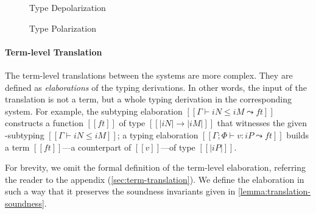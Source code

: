 \begin{figure}[ht]
  \begin{minipage}[t]{0.65\linewidth}
    \centering
      \begin{minipage}[t]{0.32\linewidth}
      \ottfundefnunpolP{}
      \end{minipage}
      \begin{minipage}[t]{0.32\linewidth}
      \ottfundefnunpolN{}
      \end{minipage}
    \caption{Type Depolarization \protect\footnotemark}
    \label{fig:depolarization}
  \end{minipage}
  \hspace{0.5cm}
  \begin{minipage}[t]{0.3\linewidth}
    \centering
    \ottfundefnpolarP{}
    \caption{Type Polarization}
    \label{fig:polarization}
  \end{minipage}

\end{figure}



\paragraph{Term-level Translation}

The term-level translations between the systems are more complex. They are
defined as \emph{elaborations} of the typing derivations. In other words, the
input of the translation is not a term, but a whole typing derivation in the
corresponding system. For example, the subtyping elaboration $[[Γ ⊢ iN ≤ iM ⤳
ft]]$ constructs a \systemf function $[[ft]]$ of type $[[|iN| → |iM|]]$ that
witnesses the given \fexists-subtyping $[[Γ ⊢ iN ≤ iM]]$; a typing elaboration
$[[Γ; Φ ⊢ v : iP ⤳ ft]]$ builds a term $[[ft]]$---a \systemf counterpart of
$[[v]]$---of type $[[|iP|]]$.

For brevity, we omit the formal definition of the term-level elaboration,
referring the reader to the appendix (\cref{sec:term-translation}). We define
the elaboration in such a way that it preserves the soundness invariants given
in \cref{lemma:translation-soundness}. 

